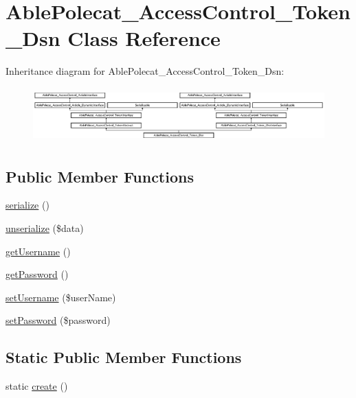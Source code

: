 \hypertarget{class_able_polecat___access_control___token___dsn}{}\section{Able\+Polecat\+\_\+\+Access\+Control\+\_\+\+Token\+\_\+\+Dsn Class Reference}
\label{class_able_polecat___access_control___token___dsn}
Inheritance diagram for Able\+Polecat\+\_\+\+Access\+Control\+\_\+\+Token\+\_\+\+Dsn\+:\begin{figure}[H]
\begin{center}
\leavevmode
\includegraphics[height=2.134146cm]{class_able_polecat___access_control___token___dsn}
\end{center}
\end{figure}
\subsection*{Public Member Functions}
\begin{DoxyCompactItemize}
\item 
\hyperlink{class_able_polecat___access_control___token___dsn_a4d9813fea8525b19a1d370eeb8fe41d6}{serialize} ()
\item 
\hyperlink{class_able_polecat___access_control___token___dsn_a91b3cb8a65e42152cacf1cf222bd26f6}{unserialize} (\$data)
\item 
\hyperlink{class_able_polecat___access_control___token___dsn_a81b37a3c9d639574e394f80c1138c75e}{get\+Username} ()
\item 
\hyperlink{class_able_polecat___access_control___token___dsn_a04e0957baeb7acde9c0c86556da2d43f}{get\+Password} ()
\item 
\hyperlink{class_able_polecat___access_control___token___dsn_a4c80b6729439466b47c85401f30885f2}{set\+Username} (\$user\+Name)
\item 
\hyperlink{class_able_polecat___access_control___token___dsn_a3e35c8d3dbb2c513c618a664389e0926}{set\+Password} (\$password)
\end{DoxyCompactItemize}
\subsection*{Static Public Member Functions}
\begin{DoxyCompactItemize}
\item 
static \hyperlink{class_able_polecat___access_control___token___dsn_a239b1c70258014a86569483c2d009de6}{create} ()
\end{DoxyCompactItemize}
